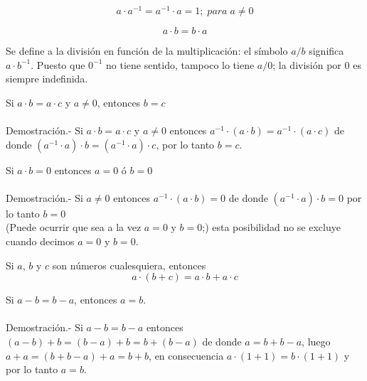 \begin{prop}
$$a\cdot a^{-1} = a^{-1} \cdot a = 1; \; para \; a\neq 0$$
\end{prop}

\begin{prop} 
$$a\cdot b = b\cdot a$$
\end{prop}

\begin{def.}
Se define a la división en función de la multiplicación: el símbolo $a/b$ significa $a\cdot b^{-1}$. Puesto que $0^{-1}$ no tiene sentido, tampoco lo tiene $a/0$; la división por $0$ es siempre indefinida. 
\end{def.}

\begin{lema}
Si $a\cdot b = a \cdot c$ y $a\neq 0$, entonces $b=c$\\\\
Demostración.- \; Si $a\cdot b = a\cdot c$ y $a\neq 0$ entonces $a^{-1} \cdot (a \cdot b) = a^{-1} \cdot (a \cdot c)$ de donde $(a^{-1} \cdot a) \cdot b = (a^{-1} \cdot a) \cdot c$, por lo tanto $b=c.$
\end{lema}

\begin{lema}
Si $a\cdot b =0$ entonces $a=0$ ó $b=0$\\\\
Demostración.- \; Si $a\neq 0$ entonces $a^{-1} \cdot (a\cdot b) = 0$ de donde  $(a^{-1} \cdot a) \cdot b =0$ por lo tanto $b=0$\\
(Puede ocurrir que sea a la vez $a=0$ y $b=0$;) esta posibilidad no se excluye cuando decimos $a=0$ y $b=0$. 
\end{lema}



\begin{prop}
Si $a$, $b$ y $c$ son números cualesquiera, entonces
$$a\cdot (b+c) = a \cdot b + a \cdot c$$
\end{prop}

\begin{lema}
Si $a-b=b-a$, entonces $a=b$.\\\\
Demostración.- \; Si $a-b=b-a$ entonces $(a-b) + b = (b-a) + b = b+ (b-a)$ de donde $a=b+b-a$, luego $a+a = (b+b-a)+a=b+b$, en consecuencia $a\cdot (1+1)=b\cdot (1+1)$ y por lo tanto $a=b$.
\end{lema}


